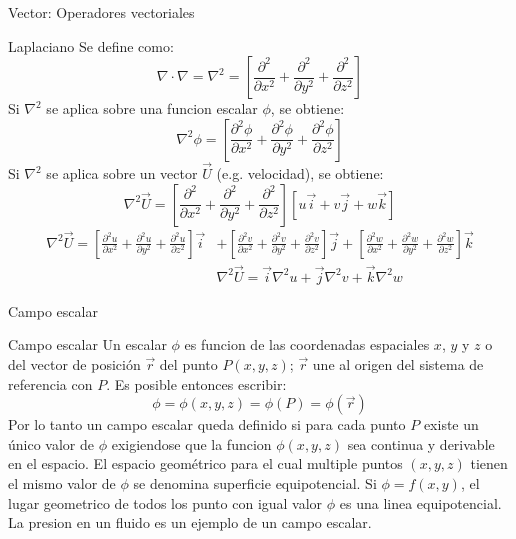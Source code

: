 \documentclass [xcolor=svgnames, t] {beamer}
\begin{document}
\begin{frame}{Vector: Operadores vectoriales}
\vspace{-0.5cm}
\footnotesize
\begin{block}{Laplaciano}
Se define como:
\begin{equation}
\nabla \cdot \nabla = \nabla^2 = \left[ \frac{\partial^2 }{\partial x^2} + \frac{\partial^2}{\partial y^2} + \frac{\partial^2}{\partial z^2} \right]
\label{lap}
\end{equation}
Si $\nabla^2$ se aplica sobre una funcion escalar $\phi$, se obtiene:
\begin{equation}
\nabla^2 \phi = \left[ \frac{\partial^2 \phi}{\partial x^2} + \frac{\partial^2 \phi}{\partial y^2} + \frac{\partial^2 \phi}{\partial z^2} \right]
\label{lap2}
\end{equation}
Si $\nabla^2$ se aplica sobre un vector  $\vec{U}$ (e.g. velocidad), se obtiene:
$$
\nabla^2 \vec{U} = \left[ \frac{\partial^2}{\partial x^2} + \frac{\partial^2}{\partial y^2} + \frac{\partial^2}{\partial z^2} \right][u\vec{i}+v\vec{j}+w\vec{k}]
$$
\begin{align}
\nabla^2 \vec{U} = \left[ \frac{\partial^2 u}{\partial x^2} + \frac{\partial^2 u}{\partial y^2} + \frac{\partial^2 u}{\partial z^2} \right]\vec{i} &+ \left[ \frac{\partial^2 v}{\partial x^2} + \frac{\partial^2 v}{\partial y^2} + \frac{\partial^2 v}{\partial z^2} \right]\vec{j} + \left[ \frac{\partial^2 w}{\partial x^2} + \frac{\partial^2 w}{\partial y^2} + \frac{\partial^2 w}{\partial z^2} \right]\vec{k}\\
&\nabla^2 \vec{U} =\vec{i} \nabla^2 u + \vec{j} \nabla^2 v + \vec{k} \nabla^2 w
\label{lap3}
\end{align}
\end{block}
\end{frame}


\begin{frame}{Campo escalar}
\begin{block}{Campo escalar}
Un escalar $\phi$ es funcion de las coordenadas espaciales $x$, $y$ y $z$ o del vector de posici\'on $\vec{r}$ del punto $P(x,y,z)$; $\vec{r}$ une al origen del sistema de referencia con  $P$. Es posible entonces escribir:
$$
\phi = \phi(x,y,z) = \phi(P)=\phi(\vec{r})
$$
Por lo tanto un campo escalar queda definido si para cada punto $P$ existe un \'unico valor de $\phi$ exigiendose que la funcion $\phi(x,y,z)$ sea continua y derivable en el espacio. El espacio geom\'etrico para el cual multiple puntos $(x,y,z)$ tienen el mismo valor de $\phi$ se denomina \alert{superficie equipotencial}. Si $\phi=f(x,y)$, el lugar geometrico de todos los punto con igual valor $\phi$ es una \alert{linea equipotencial}. La presion en un fluido es un ejemplo de un campo escalar.
\end{block}
\end{frame}
\end{document}
